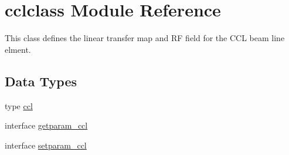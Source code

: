 \hypertarget{namespacecclclass}{}\section{cclclass Module Reference}
\label{namespacecclclass}


This class defines the linear transfer map and RF field for the C\+CL beam line elment.  


\subsection*{Data Types}
\begin{DoxyCompactItemize}
\item 
type \mbox{\hyperlink{namespacecclclass_structcclclass_1_1ccl}{ccl}}
\item 
interface \mbox{\hyperlink{interfacecclclass_1_1getparam__ccl}{getparam\+\_\+ccl}}
\item 
interface \mbox{\hyperlink{interfacecclclass_1_1setparam__ccl}{setparam\+\_\+ccl}}
\end{DoxyCompactItemize}
